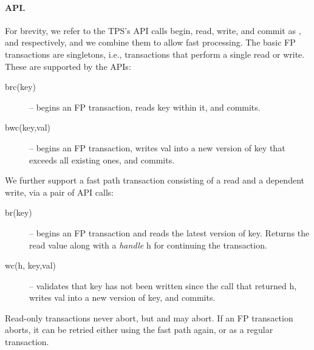 \paragraph{API.}
For brevity, we refer to the TPS's API calls  begin, read, write, and commit as , and  respectively, and 
we combine them to allow fast processing.
The basic FP transactions are singletons, i.e., transactions that perform a single
read or write. These are supported by the APIs: 
\begin{description}
\item[brc(key)] -- begins an FP transaction, reads key within it, and commits.
\item[bwc(key,val)] -- begins an FP transaction,  writes val into a new version of key that exceeds all existing ones, and commits.
\end{description}

We further support a fast path transaction consisting of a read and a dependent write, via a pair of API calls:
\begin{description}
\item[br(key)] -- begins an FP transaction and  reads the latest version of key. 
Returns the read value along with a \emph{handle} h for continuing the transaction.
\item[wc(h, key,val)] -- 	validates that key has not been written since the   call that returned h, writes val into a new version of key, and commits.
\end{description}

Read-only transactions never abort, but  and  may abort. 
If an FP transaction aborts, it can be retried either using the fast path again, or as a regular transaction.


